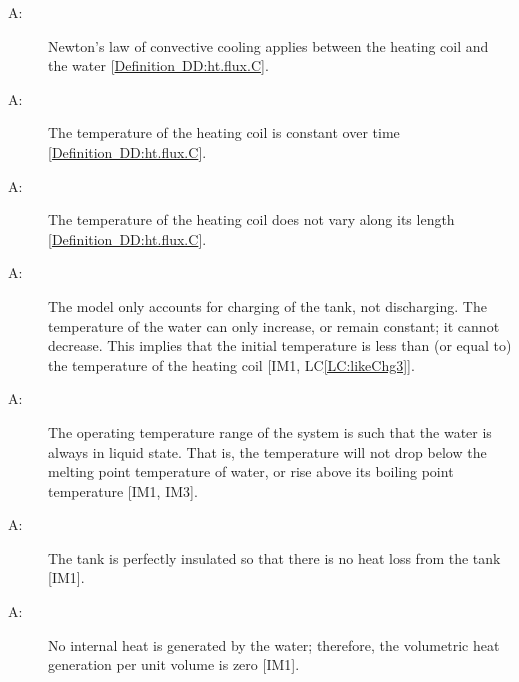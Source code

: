 \documentclass[12pt]{article}
\newcounter{assumpnum}
\newcommand{\atheassumpnum}{A\theassumpnum}
\begin{document}
\begin{description}
\item[\atheassumpnum\label{A:Law-Convective-Cooling-Coil-Water}:]Newton's law of convective cooling applies between the heating coil and the water {[}\hyperref[DD:ht.flux.C]{Definition~DD:ht.flux.C}{]}.
\end{description}
\begin{description}
\item[\atheassumpnum\label{A:Temp-Heating-Coil-Constant-over-Time}:]The temperature of the heating coil is constant over time {[}\hyperref[DD:ht.flux.C]{Definition~DD:ht.flux.C}{]}.
\end{description}
\begin{description}
\item[\atheassumpnum\label{A:Temp-Heating-Coil-Constant-over-Length}:]The temperature of the heating coil does not vary along its length {[}\hyperref[DD:ht.flux.C]{Definition~DD:ht.flux.C}{]}.
\end{description}
\begin{description}
\item[\atheassumpnum\label{A:Charging-Tank-No-Temp-Discharge}:]The model only accounts for charging of the tank, not discharging. The temperature of the water can only increase, or remain constant; it cannot decrease. This implies that the initial temperature is less than (or equal to) the temperature of the heating coil {[}IM1, LC\ref{LC:likeChg3}{]}.
\end{description}
\begin{description}
\item[\atheassumpnum\label{A:Water-Always-Liquid}:]The operating temperature range of the system is such that the water is always in liquid state. That is, the temperature will not drop below the melting point temperature of water, or rise above its boiling point temperature {[}IM1, IM3{]}.
\end{description}
\begin{description}
\item[\atheassumpnum\label{A:Perfect-Insulation-Tank}:]The tank is perfectly insulated so that there is no heat loss from the tank {[}IM1{]}.
\end{description}
\begin{description}
\item[\atheassumpnum\label{A:No-Internal-Heat-Generation-By-Water}:]No internal heat is generated by the water; therefore, the volumetric heat generation per unit volume is zero {[}IM1{]}.
\end{description}
\end{document}
